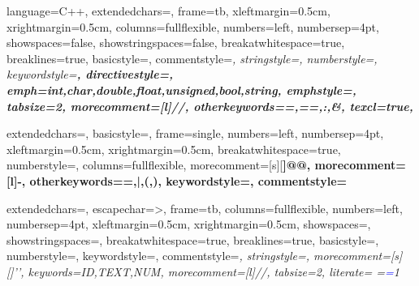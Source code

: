 \lstset
{
		language=C++,
		extendedchars=\true, %
		frame=tb, %
		xleftmargin=0.5cm,
		xrightmargin=0.5cm,
		columns=fullflexible,
		numbers=left,                    %
		numbersep=4pt,                   %
		showspaces=false,
		showstringspaces=false,
		breakatwhitespace=true,         %
		breaklines=true,                 %
		basicstyle=\color{black}\small\sffamily,%
		commentstyle=\color{gray}\itshape, %
		stringstyle=\color{orange},
		numberstyle=\footnotesize\color{gray},
		keywordstyle=\color{black}\bfseries,
		directivestyle=\color{red},
		emph={int,char,double,float,unsigned,bool,string},
		emphstyle={\color{blue}\bfseries},
		tabsize=2,
		morecomment=[l]{//},
		otherkeywords={=,==,:,&},
		texcl=true,
}

{
		extendedchars=\true,
    basicstyle=\sffamily\scriptsize,
		frame=single,
		numbers=left, %
    numbersep=4pt, %
		xleftmargin=0.5cm,
		xrightmargin=0.5cm,
		breakatwhitespace=true,         %
    numberstyle=\small\color{gray}, %
    columns=fullflexible,
    morecomment=[s][\color{blue}\bfseries]{@}{@},
    morecomment=[l]{-},
    otherkeywords={=,|,(,)},
    keywordstyle={\color{brown}\bfseries},
    commentstyle=\color{gray}\itshape
}

%
{%
		extendedchars=\true,
		escapechar=>, %
		frame=tb, %
    columns=fullflexible,
		numbers=left, %
    numbersep=4pt, %
		xleftmargin=0.5cm,
		xrightmargin=0.5cm,
		showspaces=\false,
		showstringspaces=\false,
		breakatwhitespace=true,         %
		breaklines=true,                 %
		basicstyle=\color{black}\small\sffamily,
    numberstyle=\footnotesize\color{gray}, %
    keywordstyle={\color{black}\bfseries},
		commentstyle=\color{gray}\itshape, %
		stringstyle=\color{orange}, %
    morecomment=[s][\color{blue}]{'}{'},
		keywords={ID,TEXT,NUM},%
    morecomment=[l]{//},
		tabsize=2,
		literate=
		{=}{\textcolor{blue}{=}\bfseries}1%
}

